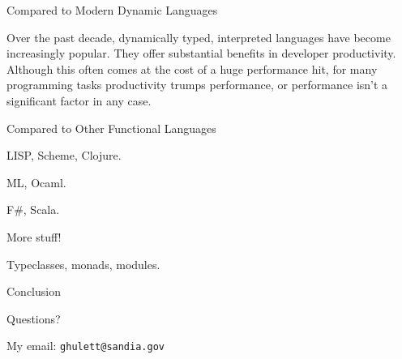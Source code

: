 %
\begin{frame}{Compared to Modern Dynamic Languages}

Over the past decade, dynamically typed, interpreted languages have become
increasingly popular. They offer substantial benefits in developer productivity.
Although this often comes at the cost of a huge performance hit, for many
programming tasks productivity trumps performance, or performance isn’t a
significant factor in any case.

% 
% 
% 
% 

\end{frame}

%
\begin{frame}{Compared to Other Functional Languages}

LISP, Scheme, Clojure.

ML, Ocaml.

F\#, Scala.

\end{frame}

%
\begin{frame}{More stuff!}

Typeclasses, monads, modules.

\end{frame}

%
\begin{frame}{Conclusion}

Questions?

My email: \texttt{ghulett@sandia.gov}

\end{frame}

